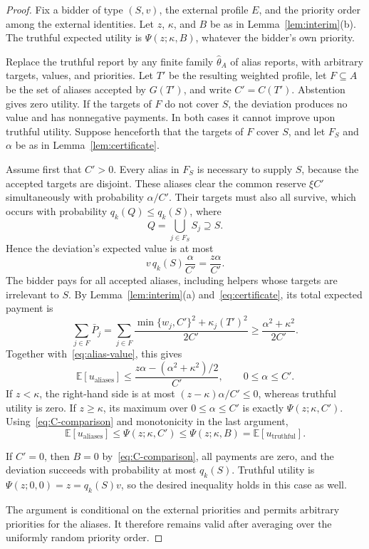 \documentclass[format=acmsmall, review=false]{acmart}
\newcommand{\E}{\mathbb{E}}
\begin{document}
\begin{proof}
Fix a bidder of type \((S,v)\), the external profile \(E\), and
the priority order among the external identities. Let \(z\),
\(\kappa\), and \(B\) be as in Lemma~\ref{lem:interim}(b). The
truthful expected utility is \(\Psi(z;\kappa,B)\), whatever the
bidder's own priority.

Replace the truthful report by any finite family
\(\hat\theta_A\) of alias reports, with arbitrary targets,
values, and priorities. Let \(T'\) be the resulting weighted
profile, let \(F\subseteq A\) be the set of aliases accepted by
\(G(T')\), and write \(C'=C(T')\). Abstention gives zero utility.
If the targets of \(F\) do not cover \(S\), the deviation
produces no value and has nonnegative payments. In both cases it
cannot improve upon truthful utility. Suppose henceforth that
the targets of \(F\) cover \(S\), and let \(F_S\) and \(\alpha\)
be as in Lemma~\ref{lem:certificate}.

Assume first that \(C'>0\). Every alias in \(F_S\) is necessary
to supply \(S\), because the accepted targets are disjoint.
These aliases clear the common reserve \(\xi C'\) simultaneously
with probability \(\alpha/C'\). Their targets must also all
survive, which occurs with probability \(q_k(Q)\le q_k(S)\),
where
\[
Q=\bigcup_{j\in F_S}S_j\supseteq S.
\]
Hence the deviation's expected value is at most
\begin{equation}\label{eq:alias-value}
v\,q_k(S)\frac{\alpha}{C'}=\frac{z\alpha}{C'}.
\end{equation}
The bidder pays for all accepted aliases, including helpers
whose targets are irrelevant to \(S\). By
Lemma~\ref{lem:interim}(a) and~\eqref{eq:certificate}, its total
expected payment is
\[
\sum_{j\in F}\bar P_j
=\sum_{j\in F}
\frac{\min\{w_j,C'\}^2+\kappa_j(T')^2}{2C'}
\ge\frac{\alpha^2+\kappa^2}{2C'}.
\]
Together with~\eqref{eq:alias-value}, this gives
\begin{equation}\label{eq:attack}
\E[u_{\mathrm{aliases}}]
\le
\frac{z\alpha-(\alpha^2+\kappa^2)/2}{C'},
\qquad
0\le\alpha\le C'.
\end{equation}
If \(z<\kappa\), the right-hand side is at most
\((z-\kappa)\alpha/C'\le0\), whereas truthful utility is zero.
If \(z\ge\kappa\), its maximum over \(0\le\alpha\le C'\) is
exactly \(\Psi(z;\kappa,C')\).
Using~\eqref{eq:C-comparison} and monotonicity in the last
argument,
\[
\E[u_{\mathrm{aliases}}]
\le
\Psi(z;\kappa,C')
\le
\Psi(z;\kappa,B)
=
\E[u_{\mathrm{truthful}}].
\]

If \(C'=0\), then \(B=0\) by~\eqref{eq:C-comparison}, all
payments are zero, and the deviation succeeds with probability
at most \(q_k(S)\). Truthful utility is
\(\Psi(z;0,0)=z=q_k(S)v\), so the desired inequality holds in
this case as well.

The argument is conditional on the external priorities and
permits arbitrary priorities for the aliases. It therefore
remains valid after averaging over the uniformly random priority
order.
\end{proof}
\end{document}
